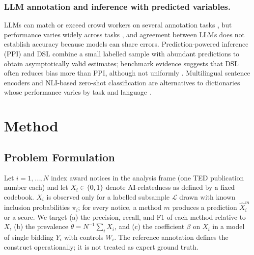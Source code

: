 \documentclass[runningheads]{llncs}
\begin{document}
\subsubsection{LLM annotation and inference with predicted variables.} LLMs can match or exceed crowd workers on several annotation tasks \cite{gilardi2023,tornberg2023}, but performance varies widely across tasks \cite{ziems2024}, and agreement between LLMs does not establish accuracy because models can share errors. Prediction-powered inference (PPI) \cite{angelopoulos2023} and DSL \cite{egami2023} combine a small labelled sample with abundant predictions to obtain asymptotically valid estimates; benchmark evidence suggests that DSL often reduces bias more than PPI, although not uniformly \cite{audinet2025}. Multilingual sentence encoders \cite{wang2024me5,reimers2020} and NLI-based zero-shot classification \cite{yin2019,he2023} are alternatives to dictionaries whose performance varies by task and language \cite{muennighoff2023,conneau2020}.

\section{Method}
\subsection{Problem Formulation}
Let $i=1,\dots,N$ index award notices in the analysis frame (one TED publication number each) and let $X_i\in\{0,1\}$ denote AI-relatedness as defined by a fixed codebook. $X_i$ is observed only for a labelled subsample $\mathcal{L}$ drawn with known inclusion probabilities $\pi_i$; for every notice, a method $m$ produces a prediction $\hat{X}^m_i$ or a score. We target (a) the precision, recall, and F1 of each method relative to $X$, (b) the prevalence $\theta=N^{-1}\sum_i X_i$, and (c) the coefficient $\beta$ on $X_i$ in a model of single bidding $Y_i$ with controls $W_i$. The reference annotation defines the construct operationally; it is not treated as expert ground truth.
\end{document}
